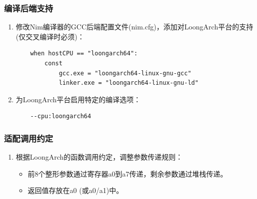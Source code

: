 \documentclass[UTF8]{ctexart}
\begin{document}
		\subsubsection{编译后端支持} %
			\begin{enumerate}[leftmargin=3.5em]
				\item 修改Nim编译器的GCC后端配置文件(nim.cfg)，添加对LoongArch平台的支持(仅交叉编译时必须)：
				\begin{tcolorbox}[colback=gray!20, colframe=gray!20, rounded corners, boxrule=-5pt, height=0.08\textheight, width=0.54\textwidth, left=0pt, right=0pt, top=0pt, bottom=0pt]
					\begin{verbatim}
	when hostCPU == "loongarch64":
		const
			gcc.exe = "loongarch64-linux-gnu-gcc"
			linker.exe = "loongarch64-linux-gnu-ld"
					\end{verbatim}
				\end{tcolorbox}
				\item 为LoongArch平台启用特定的编译选项：
				\begin{tcolorbox}[colback=gray!20, colframe=gray!20, rounded corners, boxrule=-5pt, height=0.01\textheight, width=0.22\textwidth, left=0pt, right=0pt, top=0pt, bottom=0pt]
					\begin{verbatim}
	--cpu:loongarch64
					\end{verbatim}
				\end{tcolorbox}
			\end{enumerate}
		\subsubsection{适配调用约定} %
			\begin{enumerate}[leftmargin=3.5em]
				\item 根据LoongArch的函数调用约定，调整参数传递规则：
				\begin{itemize}[leftmargin=1em]
					\item 前8个整形参数通过寄存器a0到a7传递，剩余参数通过堆栈传递。
					\item 返回值存放在a0 (或a0/a1)中。
				\end{itemize}
			\end{enumerate}
\end{document}
